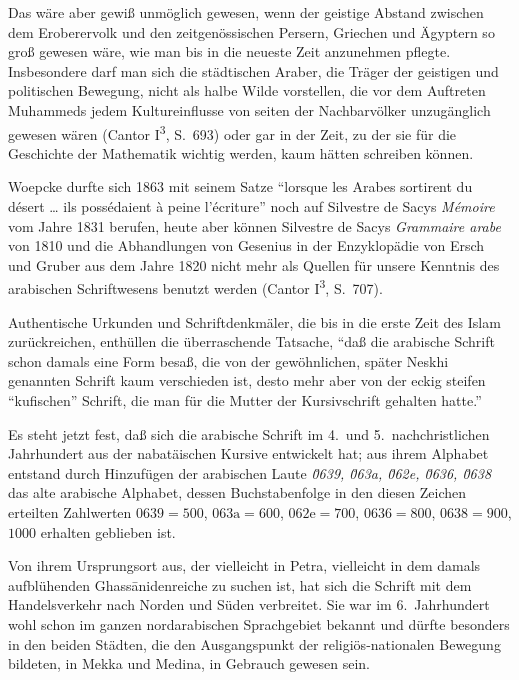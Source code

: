 \documentclass[11pt,a4paper]{article}
\newcommand{\enquote}[1]{``#1''}
\begin{document}
Das w\"are aber gewi\ss{} unm\"oglich gewesen, wenn der geistige Abstand zwischen dem Eroberervolk und den zeitgen\"ossischen Persern, Griechen und \"Agyptern so gro\ss{} gewesen w\"are, wie man bis in die neueste Zeit anzunehmen pflegte. Insbesondere darf man sich die st\"adtischen Araber, die Tr\"ager der geistigen und politischen Bewegung, nicht als halbe Wilde vorstellen, die vor dem Auftreten Muhammeds jedem Kultureinflusse von seiten der Nachbarv\"olker unzug\"anglich gewesen w\"aren (Cantor I\textsuperscript{3}, S.\ 693) oder gar in der Zeit, zu der sie f\"ur die Geschichte der Mathematik wichtig werden, kaum h\"atten schreiben k\"onnen.

Woepcke durfte sich 1863 mit seinem Satze \enquote{lorsque les Arabes sortirent du d\'esert \ldots{} ils poss\'edaient \`a peine l'\'ecriture} noch auf Silvestre de Sacys \textit{M\'emoire} vom Jahre 1831 berufen, heute aber k\"onnen Silvestre de Sacys \textit{Grammaire arabe} von 1810 und die Abhandlungen von Gesenius in der Enzyklop\"adie von Ersch und Gruber aus dem Jahre 1820 nicht mehr als Quellen f\"ur unsere Kenntnis des arabischen Schriftwesens benutzt werden (Cantor I\textsuperscript{3}, S.\ 707).

Authentische Urkunden und Schriftdenkm\"aler, die bis in die erste Zeit des Islam zur\"uckreichen, enth\"ullen die \"uberraschende Tatsache, \enquote{da\ss{} die arabische Schrift schon damals eine Form besa\ss{}, die von der gew\"ohnlichen, sp\"ater Neskhi genannten Schrift kaum verschieden ist, desto mehr aber von der eckig steifen \enquote{kufischen} Schrift, die man f\"ur die Mutter der Kursivschrift gehalten hatte.}

Es steht jetzt fest, da\ss{} sich die arabische Schrift im 4.\ und 5.\ nachchristlichen Jahrhundert aus der nabat\"aischen Kursive entwickelt hat; aus ihrem Alphabet entstand durch Hinzuf\"ugen der arabischen Laute \textit{\u0639, \u063a, \u062e, \u0636, \u0638} das alte arabische Alphabet, dessen Buchstabenfolge in den diesen Zeichen erteilten Zahlwerten $\text{\u0639}=500$, $\text{\u063a}=600$, $\text{\u062e}=700$, $\text{\u0636}=800$, $\text{\u0638}=900$, $1000$ erhalten geblieben ist.

Von ihrem Ursprungsort aus, der vielleicht in Petra, vielleicht in dem damals aufbl\"uhenden Ghass\=anidenreiche zu suchen ist, hat sich die Schrift mit dem Handelsverkehr nach Norden und S\"uden verbreitet. Sie war im 6.\ Jahrhundert wohl schon im ganzen nordarabischen Sprachgebiet bekannt und d\"urfte besonders in den beiden St\"adten, die den Ausgangspunkt der religi\"os-nationalen Bewegung bildeten, in Mekka und Medina, in Gebrauch gewesen sein.
\end{document}
